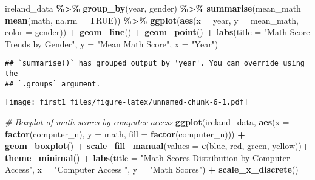 \documentclass[
]{article}
\newenvironment{Shaded}{\begin{snugshade}}{\end{snugshade}}
\newcommand{\AttributeTok}[1]{\textcolor[rgb]{0.13,0.29,0.53}{#1}}
\newcommand{\CommentTok}[1]{\textcolor[rgb]{0.56,0.35,0.01}{\textit{#1}}}
\newcommand{\ConstantTok}[1]{\textcolor[rgb]{0.56,0.35,0.01}{#1}}
\newcommand{\FunctionTok}[1]{\textcolor[rgb]{0.13,0.29,0.53}{\textbf{#1}}}
\newcommand{\NormalTok}[1]{#1}
\newcommand{\SpecialCharTok}[1]{\textcolor[rgb]{0.81,0.36,0.00}{\textbf{#1}}}
\newcommand{\StringTok}[1]{\textcolor[rgb]{0.31,0.60,0.02}{#1}}
\begin{document}
\begin{Shaded}
\begin{Highlighting}[]
\NormalTok{ireland\_data }\SpecialCharTok{\%\textgreater{}\%}
  \FunctionTok{group\_by}\NormalTok{(year, gender) }\SpecialCharTok{\%\textgreater{}\%}
  \FunctionTok{summarise}\NormalTok{(}\AttributeTok{mean\_math =} \FunctionTok{mean}\NormalTok{(math, }\AttributeTok{na.rm =} \ConstantTok{TRUE}\NormalTok{)) }\SpecialCharTok{\%\textgreater{}\%}
  \FunctionTok{ggplot}\NormalTok{(}\FunctionTok{aes}\NormalTok{(}\AttributeTok{x =}\NormalTok{ year, }\AttributeTok{y =}\NormalTok{ mean\_math, }\AttributeTok{color =}\NormalTok{ gender)) }\SpecialCharTok{+}
  \FunctionTok{geom\_line}\NormalTok{() }\SpecialCharTok{+} \FunctionTok{geom\_point}\NormalTok{() }\SpecialCharTok{+}
  \FunctionTok{labs}\NormalTok{(}\AttributeTok{title =} \StringTok{"Math Score Trends by Gender"}\NormalTok{, }\AttributeTok{y =} \StringTok{"Mean Math Score"}\NormalTok{, }\AttributeTok{x =} \StringTok{"Year"}\NormalTok{)}
\end{Highlighting}
\end{Shaded}

\begin{verbatim}
## `summarise()` has grouped output by 'year'. You can override using the
## `.groups` argument.
\end{verbatim}

\texttt{[image: first1\_files/figure-latex/unnamed-chunk-6-1.pdf]}

\begin{Shaded}
\begin{Highlighting}[]
\CommentTok{\# Boxplot of math scores by computer access}
\FunctionTok{ggplot}\NormalTok{(ireland\_data, }\FunctionTok{aes}\NormalTok{(}\AttributeTok{x =} \FunctionTok{factor}\NormalTok{(computer\_n), }\AttributeTok{y =}\NormalTok{ math, }\AttributeTok{fill =} \FunctionTok{factor}\NormalTok{(computer\_n))) }\SpecialCharTok{+}
  \FunctionTok{geom\_boxplot}\NormalTok{() }\SpecialCharTok{+}
  \FunctionTok{scale\_fill\_manual}\NormalTok{(}\AttributeTok{values =} \FunctionTok{c}\NormalTok{(}\StringTok{\textquotesingle{}blue\textquotesingle{}}\NormalTok{, }\StringTok{\textquotesingle{}red\textquotesingle{}}\NormalTok{, }\StringTok{\textquotesingle{}green\textquotesingle{}}\NormalTok{, }\StringTok{\textquotesingle{}yellow\textquotesingle{}}\NormalTok{))}\SpecialCharTok{+}
  \FunctionTok{theme\_minimal}\NormalTok{() }\SpecialCharTok{+}
  \FunctionTok{labs}\NormalTok{(}\AttributeTok{title =} \StringTok{"Math Scores Distribution by Computer Access"}\NormalTok{,}
       \AttributeTok{x =} \StringTok{"Computer Access "}\NormalTok{,}
       \AttributeTok{y =} \StringTok{"Math Scores"}\NormalTok{) }\SpecialCharTok{+}
  \FunctionTok{scale\_x\_discrete}\NormalTok{()}
\end{Highlighting}
\end{Shaded}
\end{document}
